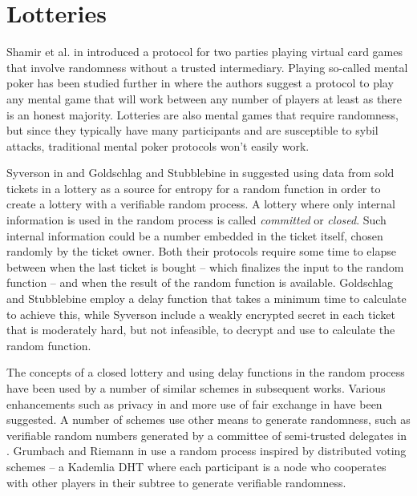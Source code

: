 \section{Lotteries}
\label{sec:lotteries}

Shamir et al. in \cite{shamir_mental_1981} introduced a protocol for two parties playing virtual card games that involve randomness without a trusted intermediary. Playing so-called mental poker has been studied further in \cite{goldreich_how_1987} where the authors suggest a protocol to play any mental game that will work between any number of players at least as there is an honest majority. Lotteries are also mental games that require randomness, but since they typically have many participants and are susceptible to sybil attacks, traditional mental poker protocols won't easily work.

Syverson in \cite{syverson_weakly_1998} and Goldschlag and Stubblebine in \cite{goldschlag_publicly_1998} suggested using data from sold tickets in a lottery as a source for entropy for a random function in order to create a lottery with a verifiable random process. A lottery where only internal information is used in the random process is called \emph{committed} or \emph{closed}. Such internal information could be a number embedded in the ticket itself, chosen randomly by the ticket owner. Both their protocols require some time to elapse between when the last ticket is bought – which finalizes the input to the random function – and when the result of the random function is available. Goldschlag and Stubblebine employ a delay function that takes a minimum time to calculate to achieve this, while Syverson include a weakly encrypted secret in each ticket that is moderately hard, but not infeasible, to decrypt and use to calculate the random function.

The concepts of a closed lottery and using delay functions in the random process have been used by a number of similar schemes in subsequent works. Various enhancements such as privacy in \cite{zhou_playing_2001} and more use of fair exchange in \cite{chow_e-lottery_2005} have been suggested. A number of schemes use other means to generate randomness, such as verifiable random numbers generated by a committee of semi-trusted delegates in \cite{fouque_sharing_2001, lee_design_2009, liu_improved_2014, xia_information_2019}. Grumbach and Riemann in \cite{grumbach_distributed_2017} use a random process inspired by distributed voting schemes – a Kademlia DHT where each participant is a node who cooperates with other players in their subtree to generate verifiable randomness. 

